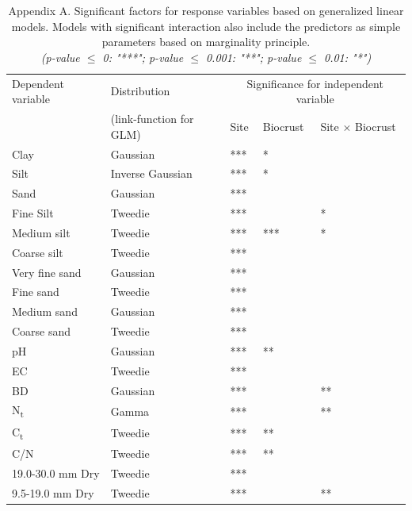 \begin{table}[htbp] %
\centering %
\caption[Significant factors for response variables based on generalized linear models]{Appendix A. Significant factors for response variables based on generalized linear models. Models with significant interaction also include the predictors as simple parameters based on marginality principle. \\ %
\textit{(p-value $\le$ 0: "***"; p-value $\le$ 0.001: "**"; p-value $\le$ 0.01: "*")}} %
\label{tab:appendix_a} %
\begin{tabular}{@{}lllll@{}} %
\toprule
Dependent variable & Distribution & \multicolumn{3}{c}{Significance for independent variable} \\
\cmidrule(lr){3-5} %
 & (link-function for GLM) & Site & Biocrust & Site $\times$ Biocrust \\ %
\midrule
Clay	& Gaussian	& ***	& *	& \\
Silt	& Inverse Gaussian	& ***	& *	& \\
Sand	& Gaussian	& ***	& 	& \\
Fine Silt	& Tweedie	& ***	& 	& * \\
Medium silt	& Tweedie	& ***	& ***	& * \\
Coarse silt	& Tweedie	& ***	& 	&  \\
Very fine sand	& Gaussian	& ***	& 	&  \\
Fine sand	& Tweedie	& ***	& 	&  \\
Medium sand	& Gaussian	& ***	& 	&  \\
Coarse sand	& Tweedie	& ***	& 	&  \\
pH	& Gaussian	& ***	& **	&  \\
EC	& Tweedie	& ***	& 	&  \\
BD	& Gaussian	& ***	& 	& ** \\
N\textsubscript{t}	& Gamma	& ***	& 	& ** \\ %
C\textsubscript{t}	& Tweedie	& ***	& **	&  \\ %
C/N	& Tweedie	& ***	& **	&  \\
19.0-30.0 mm Dry	& Tweedie	& ***	& 	&  \\
9.5-19.0 mm Dry	& Tweedie	& ***	& 	& ** \\

\end{tabular}
\end{table}
